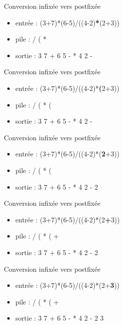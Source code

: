 \documentclass[12pt,a4paper]{beamer}
\begin{document}
\begin{frame}{Conversion infixée vers postfixée}
\begin{itemize}
\item entrée : (3+7)*(6-5)/((4-2)\textbf{*}(2+3))
\item pile : / ( *
\item sortie : 3 7 + 6 5 - * 4 2 -
\end{itemize}
\end{frame}

\begin{frame}{Conversion infixée vers postfixée}
\begin{itemize}
\item entrée : (3+7)*(6-5)/((4-2)*\textbf{(}2+3))
\item pile : / ( * (
\item sortie : 3 7 + 6 5 - * 4 2 -
\end{itemize}
\end{frame}

\begin{frame}{Conversion infixée vers postfixée}
\begin{itemize}
\item entrée : (3+7)*(6-5)/((4-2)*(\textbf{2}+3))
\item pile : / ( * (
\item sortie : 3 7 + 6 5 - * 4 2 - 2
\end{itemize}
\end{frame}

\begin{frame}{Conversion infixée vers postfixée}
\begin{itemize}
\item entrée : (3+7)*(6-5)/((4-2)*(2\textbf{+}3))
\item pile : / ( * ( +
\item sortie : 3 7 + 6 5 - * 4 2 - 2
\end{itemize}
\end{frame}

\begin{frame}{Conversion infixée vers postfixée}
\begin{itemize}
\item entrée : (3+7)*(6-5)/((4-2)*(2+\textbf{3}))
\item pile : / ( * ( +
\item sortie : 3 7 + 6 5 - * 4 2 - 2 3
\end{itemize}
\end{frame}
\end{document}
